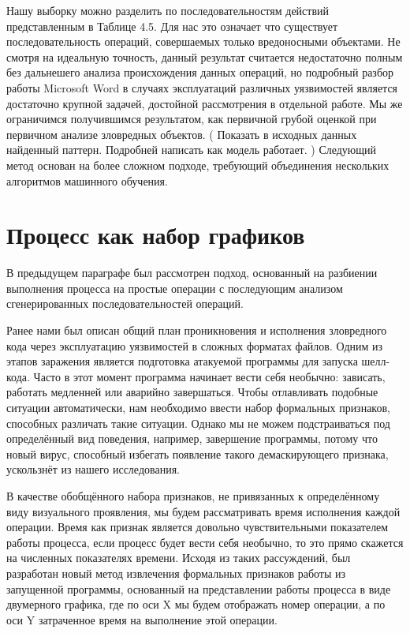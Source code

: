 Нашу выборку можно разделить по последовательностям действий представленным в Таблице 4.5.
Для нас это означает что существует последовательность операций, совершаемых только вредоносными объектами.
Не смотря на идеальную точность, данный результат считается недостаточно полным без дальнешего анализа происхождения данных операций, но подробный разбор работы Microsoft Word в случаях эксплуатаций различных уязвимостей является достаточно крупной задачей, достойной рассмотрения в отдельной работе.
Мы же ограничимся получившимся результатом, как первичной грубой оценкой при первичном анализе зловредных объектов.
( Показать в исходных данных найденный паттерн. Подробней написать как модель работает. )
Следующий метод основан на более сложном подходе, требующий объединения нескольких алгоритмов машинного обучения.

\section{Процесс как набор графиков}

В предыдущем параграфе был рассмотрен подход, основанный на разбиении выполнения процесса на простые операции с последующим анализом сгенерированных последовательностей операций.

Ранее нами был описан общий план проникновения и исполнения зловредного кода через эксплуатацию уязвимостей в сложных форматах файлов. Одним из этапов заражения является подготовка атакуемой программы для запуска шелл-кода. Часто в этот момент программа начинает вести себя необычно: зависать, работать медленней или аварийно завершаться. Чтобы отлавливать подобные ситуации автоматически, нам необходимо ввести набор формальных признаков, способных различать такие ситуации. Однако мы не можем подстраиваться под определённый вид поведения, например, завершение программы, потому что новый вирус, способный избегать появление такого демаскирующего признака, ускользнёт из нашего исследования.

В качестве обобщённого набора признаков, не привязанных к определённому виду визуального проявления, мы будем рассматривать время исполнения каждой операции. Время как признак является довольно чувствительными показателем работы процесса, если процесс будет вести себя необычно, то это прямо скажется на численных показателях времени. Исходя из таких рассуждений, был разработан новый метод извлечения формальных признаков работы из запущенной программы, основанный на представлении работы процесса в виде двумерного графика, где по оси X мы будем отображать номер операции, а по оси Y затраченное время на выполнение этой операции. 

